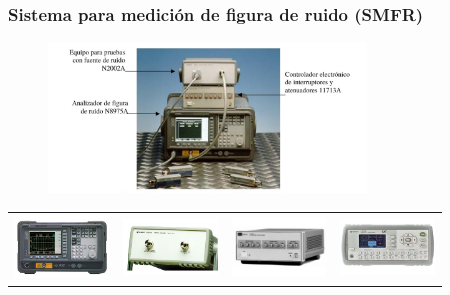 \documentclass[xcolor=pdftext, table]{beamer}
\begin{document}
	\begin{frame}
		\frametitle{Sistema para medición de figura de ruido (SMFR)}	
	
		\begin{figure}		
			\includegraphics[height=4cm]{Imagenes/SistemaMedicionFiguraRuido.pdf}	
		\end{figure}			

		\begin{table}
			\tiny		
			\begin{tabular}{p{2.5cm}p{2.5cm}p{2.5cm}p{2.5cm}}
				\begin{minipage}{2.5cm}
					\includegraphics[width=2.5cm]{Imagenes/N8975A.pdf}				
				\end{minipage} &	
				\begin{minipage}{2.5cm}
					\includegraphics[width=2.5cm]{Imagenes/N2002A.pdf}
				\end{minipage} &							
				\begin{minipage}{2.5cm}
					\includegraphics[width=2.5cm]{Imagenes/11713A.pdf}
				\end{minipage} &	
				\begin{minipage}{2.5cm}
					\includegraphics[width=2.5cm]{Imagenes/11713B.pdf}
				\end{minipage} \\
													

\end{tabular}
\end{table}
\end{frame}
\end{document}
